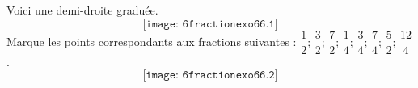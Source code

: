 Voici une demi-droite graduée.
\[\texttt{[image: 6fractionexo66.1]}\]
Marque les points correspondants aux fractions suivantes : $\dfrac12$; $\dfrac32$; $\dfrac72$; $\dfrac14$; $\dfrac34$; $\dfrac74$; $\dfrac52$; $\dfrac{12}4$.
\[\texttt{[image: 6fractionexo66.2]}\]